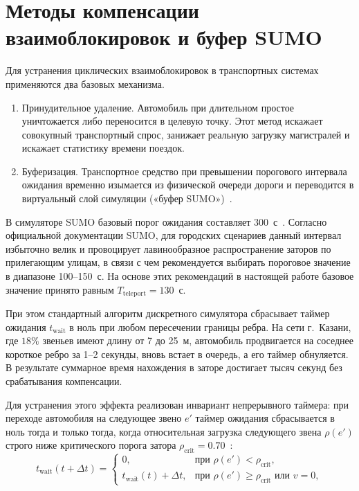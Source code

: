 \section{Методы компенсации взаимоблокировок и буфер SUMO}
\label{sec:unblocking_methods}

Для устранения циклических взаимоблокировок в транспортных системах применяются два базовых механизма.
\begin{enumerate}
    \item Принудительное удаление. Автомобиль при длительном простое уничтожается либо переносится в целевую точку. Этот метод искажает совокупный транспортный спрос, занижает реальную загрузку магистралей и искажает статистику времени поездок.
    \item Буферизация. Транспортное средство при превышении порогового интервала ожидания временно изымается из физической очереди дороги и переводится в виртуальный слой симуляции («буфер SUMO»)~\cite{krajzewicz2012sumo, sumo_teleport}.
\end{enumerate}

В симуляторе SUMO базовый порог ожидания составляет 300~с~\cite{sumo_teleport}. Согласно официальной документации SUMO, для городских сценариев данный интервал избыточно велик и провоцирует лавинообразное распространение заторов по прилегающим улицам, в связи с чем рекомендуется выбирать пороговое значение в диапазоне 100--150~с. На основе этих рекомендаций в настоящей работе базовое значение принято равным $T_{\text{teleport}} = 130$~с.

При этом стандартный алгоритм дискретного симулятора сбрасывает таймер ожидания $t_{\text{wait}}$ в ноль при любом пересечении границы ребра. На сети г.~Казани, где $18\%$ звеньев имеют длину от 7 до 25~м, автомобиль продвигается на соседнее короткое ребро за 1--2 секунды, вновь встает в очередь, а его таймер обнуляется. В результате суммарное время нахождения в заторе достигает тысяч секунд без срабатывания компенсации.

Для устранения этого эффекта реализован инвариант непрерывного таймера: при переходе автомобиля на следующее звено $e'$ таймер ожидания сбрасывается в ноль тогда и только тогда, когда относительная загрузка следующего звена $\rho(e')$ строго ниже критического порога затора $\rho_{\text{crit}} = 0.70$~\cite{behrisch2011sumo_meso, daganzo1994ctm}:
\begin{equation}
t_{\text{wait}}(t+\Delta t) = 
\begin{cases} 
0, & \text{при } \rho(e') < \rho_{\text{crit}}, \\
t_{\text{wait}}(t) + \Delta t, & \text{при } \rho(e') \ge \rho_{\text{crit}} \text{ или } v = 0,
\end{cases}
\label{eq:conttimer_invariant}
\end{equation}

